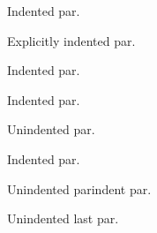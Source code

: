 \documentclass{article}
\begin{document}
Indented par.

\indent Explicitly indented par.

Indented par. \noindent

Indented par.

\noindent Unindented par.

Indented par. \setlength{\parindent}{0pt}

Unindented parindent par.

Unindented last par.
\end{document}
